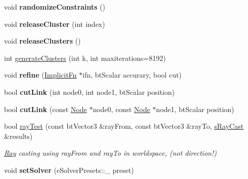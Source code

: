 \begin{DoxyCompactItemize}
\item 
\mbox{\label{classbtSoftBody_acc984ed7b1ae0c8520d474f4ba3e053f}} 
void {\bfseries randomize\+Constraints} ()
\item 
\mbox{\label{classbtSoftBody_a916cd79e87cf151686267100cb83031c}} 
void {\bfseries release\+Cluster} (int index)
\item 
\mbox{\label{classbtSoftBody_a9acc6f49f29e890115e42c4deec24f85}} 
void {\bfseries release\+Clusters} ()
\item 
int \hyperlink{classbtSoftBody_a9915ca0d99dbeb9f39221dab218d5208}{generate\+Clusters} (int k, int maxiterations=8192)
\item 
\mbox{\label{classbtSoftBody_a9d29ac0eb82c40645c17b5082a7325c9}} 
void {\bfseries refine} (\hyperlink{structbtSoftBody_1_1ImplicitFn}{Implicit\+Fn} $\ast$ifn, bt\+Scalar accurary, bool cut)
\item 
\mbox{\label{classbtSoftBody_a16f221920ddcc0485c13e6fba169c291}} 
bool {\bfseries cut\+Link} (int node0, int node1, bt\+Scalar position)
\item 
\mbox{\label{classbtSoftBody_a1dd5a0790a03d3680f2dc939ea3a19e5}} 
bool {\bfseries cut\+Link} (const \hyperlink{structbtSoftBody_1_1Node}{Node} $\ast$node0, const \hyperlink{structbtSoftBody_1_1Node}{Node} $\ast$node1, bt\+Scalar position)
\item 
\mbox{\label{classbtSoftBody_a3133d790dcff71b8e8a43eb966097485}} 
bool \hyperlink{classbtSoftBody_a3133d790dcff71b8e8a43eb966097485}{ray\+Test} (const bt\+Vector3 \&ray\+From, const bt\+Vector3 \&ray\+To, \hyperlink{structbtSoftBody_1_1sRayCast}{s\+Ray\+Cast} \&results)
\begin{DoxyCompactList}\small\item\em \hyperlink{classRay}{Ray} casting using ray\+From and ray\+To in worldspace, (not direction!) \end{DoxyCompactList}\item 
\mbox{\label{classbtSoftBody_a9da956f8d824e44cae9f8b37eff54c19}} 
void {\bfseries set\+Solver} (e\+Solver\+Presets\+::\+\_\+ preset)

\end{DoxyCompactItemize}
